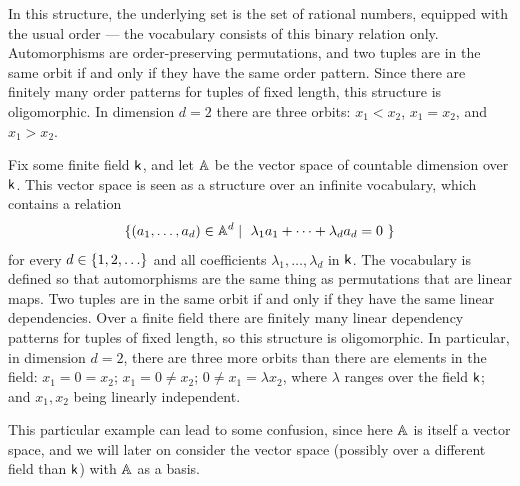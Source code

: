\begin{myexample} \label{ex:order-atoms} In this structure, the underlying set is the set of rational numbers, equipped with the usual order --- 
the vocabulary consists of this binary relation only.
Automorphisms are order-preserving permutations, and two tuples are in the same orbit if and only if they have the same order pattern. Since there are finitely many order patterns for tuples of fixed length, this structure is oligomorphic. 
In dimension $d = 2$ there are three orbits: 
$x_1 < x_2$, $x_1 = x_2$, and $x_1 > x_2$.
\end{myexample}

\begin{myexample}
     \label{ex:vector-space-atoms} Fix some finite field $\mathsf{k}$, and let $\mathbb{A}$ be the vector space of countable dimension over $\mathsf{k}$. This vector space is seen as a structure over an infinite vocabulary, which contains a relation 
    \begin{align*}
    \{(a_1,\ldots,a_d) \in \mathbb{A}^d \mid \text{ $\lambda_1 a_1 + \cdots + \lambda_d a_d = 0$ }\}
    \end{align*}
    for every $d \in \{1,2,\ldots\}$ and all coefficients $\lambda_1, \ldots, \lambda_d$ in $\mathsf{k}$. The vocabulary is defined so that automorphisms are the same thing as permutations that are linear maps. Two tuples are in the same orbit if and only if they have the same linear dependencies. Over a finite field there are finitely many linear dependency patterns for tuples of fixed length, so this structure is oligomorphic.
    In particular, in dimension $d = 2$, there are three more orbits than there are elements in the field: 
    $x_1 = 0 = x_2$;
    $x_1 = 0 \neq x_2$;
    $0 \neq x_1 = \lambda x_2$, where $\lambda$ ranges over the field $\mathsf{k}$;
    and $x_1, x_2$ being linearly independent. 
    
    This particular example can lead to some confusion, since here $\mathbb{A}$ is itself a vector space, and we will later on consider the vector space (possibly over a different field than $\mathsf{k}$) with $\mathbb{A}$ as a basis. %
\end{myexample}

